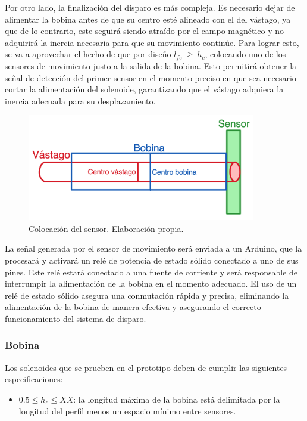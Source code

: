 Por otro lado, la finalización del disparo es más compleja. Es necesario dejar de alimentar la bobina antes de que su centro esté alineado con el del vástago, ya que de lo contrario, este seguirá siendo atraído por el campo magnético y no adquirirá la inercia necesaria para que su movimiento continúe. Para lograr esto, se va a aprovechar el hecho de que por diseño \(l_{fe}~\geq~h_c\), colocando uno de los sensores de movimiento justo a la salida de la bobina. Esto permitirá obtener la señal de detección del primer sensor en el momento preciso en que sea necesario cortar la alimentación del solenoide, garantizando que el vástago adquiera la inercia adecuada para su desplazamiento.

\begin{figure}[H]
    \centering
    \includegraphics[width=10cm]{FigurasMemoria/esquemaJustDisparo.png}
    \caption{Colocación del sensor. Elaboración propia.}
    \label{fig:esquemaJustDisparo} %
\end{figure}

La señal generada por el sensor de movimiento será enviada a un Arduino, que la procesará y activará un relé de potencia de estado sólido conectado a uno de sus pines. Este relé estará conectado a una fuente de corriente y será responsable de interrumpir la alimentación de la bobina en el momento adecuado. El uso de un relé de estado sólido asegura una conmutación rápida y precisa, eliminando la alimentación de la bobina de manera efectiva y asegurando el correcto funcionamiento del sistema de disparo.
 
\subsubsection{Bobina}
\label{subsub:bobina}

Los solenoides que se prueben en el prototipo deben de cumplir las siguientes especificaciones:


\begin{itemize}
    \item \(0.5\leq h_{c} \leq XX\): la longitud máxima de la bobina está delimitada por la longitud del perfil menos un espacio mínimo entre sensores.
\end{itemize}